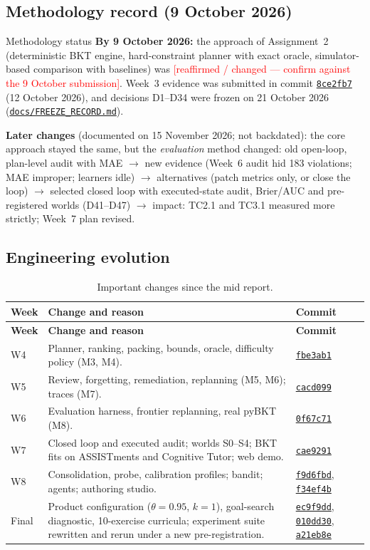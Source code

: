 \documentclass[11pt,a4paper]{article}
\newcommand{\fillin}[1]{\textcolor{red}{[#1]}}
\newcommand{\finaltag}{cs5903-final-2026}
\newcommand{\repobase}{https://github.com/vhemanth06/AdaptEngine}
\newcommand{\repo}[1]{\href{\repobase/blob/\finaltag/#1}{\nolinkurl{#1}}}
\newcommand{\commit}[1]{\href{\repobase/commit/#1}{\texttt{#1}}}
\begin{document}
\subsection{Methodology record (9 October 2026)}

\begin{keybox}{Methodology status}
\textbf{By 9 October 2026:} the approach of Assignment~2 (deterministic BKT engine, hard-constraint planner with exact oracle, simulator-based comparison with baselines) was \fillin{reaffirmed / changed --- confirm against the 9 October submission}. Week~3 evidence was submitted in commit \commit{8ce2fb7} (12 October 2026), and decisions D1--D34 were frozen on 21 October 2026 (\repo{docs/FREEZE_RECORD.md}).

\textbf{Later changes} (documented on 15 November 2026; not backdated): the core approach stayed the same, but the \emph{evaluation} method changed:
old open-loop, plan-level audit with MAE $\rightarrow$ new evidence (Week~6 audit hid 183 violations; MAE improper; learners idle) $\rightarrow$ alternatives (patch metrics only, or close the loop) $\rightarrow$ selected closed loop with executed-state audit, Brier/AUC and pre-registered worlds (D41--D47) $\rightarrow$ impact: TC2.1 and TC3.1 measured more strictly; Week~7 plan revised.
\end{keybox}

\subsection{Engineering evolution}

\begin{xltabular}{\textwidth}{
    @{}
    >{\raggedright\arraybackslash}p{0.13\textwidth}
    >{\raggedright\arraybackslash}X
    >{\raggedright\arraybackslash}p{0.17\textwidth}
    @{}
}
\caption{Important changes since the mid report.}
\label{tab:evolution}\\
\toprule
\textbf{Week} & \textbf{Change and reason} & \textbf{Commit} \\
\midrule
\endfirsthead
\toprule
\textbf{Week} & \textbf{Change and reason} & \textbf{Commit} \\
\midrule
\endhead
\bottomrule
\endfoot
W4 & Planner, ranking, packing, bounds, oracle, difficulty policy (M3, M4). & \commit{fbe3ab1} \\
W5 & Review, forgetting, remediation, replanning (M5, M6); traces (M7). & \commit{cacd099} \\
W6 & Evaluation harness, frontier replanning, real pyBKT (M8). & \commit{0f67c71} \\
W7 & Closed loop and executed audit; worlds S0--S4; BKT fits on ASSISTments and Cognitive Tutor; web demo. & \commit{cae9291} \\
W8 & Consolidation, probe, calibration profiles; bandit; agents; authoring studio. & \commit{f9d6fbd}, \commit{f34ef4b} \\
Final & Product configuration ($\theta=0.95$, $k=1$), goal-search diagnostic, 10-exercise curricula; experiment suite rewritten and rerun under a new pre-registration. & \commit{ec9f9dd}, \commit{010dd30}, \commit{a21eb8e} \\
\end{xltabular}
\end{document}
